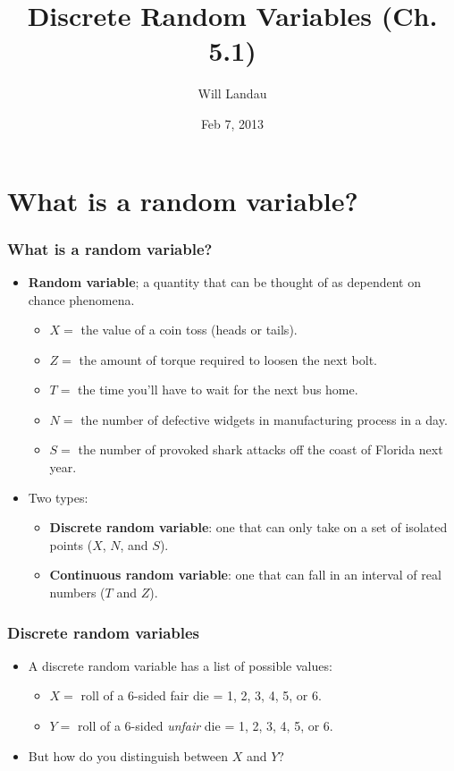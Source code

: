 \documentclass[handout]{beamer}\usepackage{graphicx, color}
\title{Discrete Random Variables (Ch. 5.1)}
\author{Will Landau}
\date{Feb 7, 2013}
\institute{Iowa State University}
\numberwithin{equation}{section}
\begin{document}
\begin{frame}
\titlepage
 \end{frame}
 

\section{What is a random variable?}

\begin{frame}
\frametitle{What is a random variable?}
\begin{itemize}
\pause \item {\bf Random variable}; a quantity that can be thought of as dependent on chance phenomena.
\begin{itemize}
\pause \item $X = $ the value of a coin toss (heads or tails).
\pause \item $Z = $ the amount of torque required to loosen the next bolt.
\pause \item $T = $ the time you'll have to wait for the next bus home.
\pause \item $N = $ the number of defective widgets in manufacturing process in a day.
\pause \item $S = $ the number of provoked shark attacks off the coast of Florida next year.
\end{itemize}
\pause \item Two types:
\begin{itemize}
\pause \item {\bf Discrete random variable}: one that can only take on a set of isolated points ($X$, $N$, and $S$).
\pause \item {\bf Continuous random variable}: one that can fall in an interval of real numbers ($T$ and $Z$). 
\end{itemize}
\end{itemize}
\end{frame}

\begin{frame}
\frametitle{Discrete random variables}
\begin{itemize}
\pause \item A discrete random variable has a list of possible values:
\begin{itemize}
\pause \item $X = $ roll of a 6-sided fair die = 1, 2, 3, 4, 5, or 6.
\pause \item $Y = $ roll of a 6-sided \emph{unfair} die = 1, 2, 3, 4, 5, or 6. 
\end{itemize}
\pause \item But how do you distinguish between $X$ and $Y$?
\end{itemize}
\end{frame}
\end{document}
